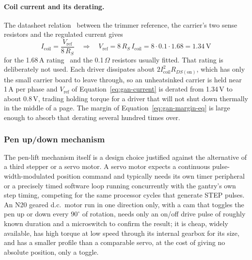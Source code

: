 \paragraph{Coil current and its derating.}
The datasheet relation~\cite[p.~9]{a4988ds} between the trimmer reference, the carrier's two sense resistors and the regulated current gives
\begin{equation}
I_{\mathrm{coil}}=\frac{V_{\mathrm{ref}}}{8\,R_S}\quad\Longrightarrow\quad V_{\mathrm{ref}}=8\,R_S\,I_{\mathrm{coil}}=8\cdot0.1\cdot1.68=1.34\ \mathrm{V}
\label{eq:gan-current}
\end{equation}
for the 1.68\,A rating~\cite{stepperds} and the 0.1\,$\Omega$ resistors usually fitted. That rating is deliberately not used. Each driver dissipates about $2I_{\mathrm{coil}}^2R_{DS(\mathrm{on})}$, which has only the small carrier board to leave through, so an unheatsinked carrier is held near 1\,A per phase and $V_{\mathrm{ref}}$ of Equation~\ref{eq:gan-current} is derated from 1.34\,V to about 0.8\,V, trading holding torque for a driver that will not shut down thermally in the middle of a page. The margin of Equation~\ref{eq:gan-margin-eq} is large enough to absorb that derating several hundred times over.

\subsubsection{Pen up/down mechanism}
The pen-lift mechanism itself is a design choice justified against the alternative of a third stepper or a servo motor. A servo motor expects a continuous pulse-width-modulated position command and typically needs its own timer peripheral or a precisely timed software loop running concurrently with the gantry's own step timing, competing for the same processor cycles that generate STEP pulses. An N20 geared d.c.\ motor run in one direction only, with a cam that toggles the pen up or down every $90^\circ$ of rotation, needs only an on/off drive pulse of roughly known duration and a microswitch to confirm the result; it is cheap, widely available, has high torque at low speed through its internal gearbox for its size, and has a smaller profile than a comparable servo, at the cost of giving no absolute position, only a toggle.

